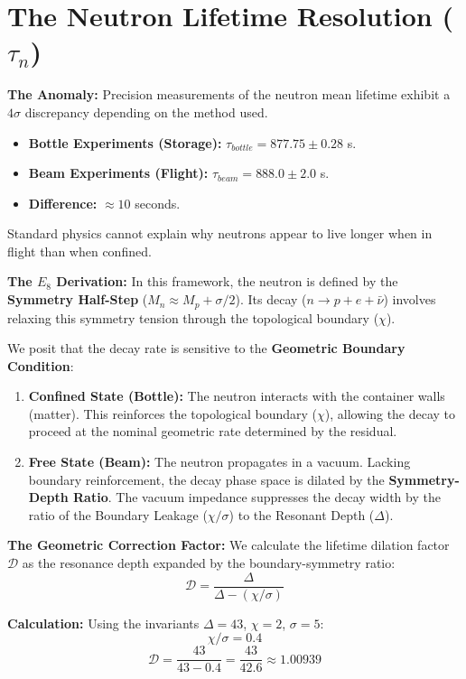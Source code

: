 \section{The Neutron Lifetime Resolution (\texorpdfstring{$\tau_n$}{taun})}

\textbf{The Anomaly:} Precision measurements of the neutron mean lifetime exhibit a $4\sigma$ discrepancy depending on the method used.
\begin{itemize}
    \item \textbf{Bottle Experiments (Storage):} $\tau_{bottle} = 877.75 \pm 0.28$ s.
    \item \textbf{Beam Experiments (Flight):} $\tau_{beam} = 888.0 \pm 2.0$ s.
    \item \textbf{Difference:} $\approx 10$ seconds.
\end{itemize}
Standard physics cannot explain why neutrons appear to live longer when in flight than when confined.

\textbf{The $E_8$ Derivation:} In this framework, the neutron is defined by the \textbf{Symmetry Half-Step} ($M_n \approx M_p + \sigma/2$). Its decay ($n \to p + e + \bar{\nu}$) involves relaxing this symmetry tension through the topological boundary ($\chi$).

We posit that the decay rate is sensitive to the \textbf{Geometric Boundary Condition}:
\begin{enumerate}
    \item \textbf{Confined State (Bottle):} The neutron interacts with the container walls (matter). This reinforces the topological boundary ($\chi$), allowing the decay to proceed at the nominal geometric rate determined by the residual.
    \item \textbf{Free State (Beam):} The neutron propagates in a vacuum. Lacking boundary reinforcement, the decay phase space is dilated by the \textbf{Symmetry-Depth Ratio}. The vacuum impedance suppresses the decay width by the ratio of the Boundary Leakage ($\chi/\sigma$) to the Resonant Depth ($\Delta$).
\end{enumerate}

\textbf{The Geometric Correction Factor:}
We calculate the lifetime dilation factor $\mathcal{D}$ as the resonance depth expanded by the boundary-symmetry ratio:
\begin{equation}
\mathcal{D} = \frac{\Delta}{\Delta - (\chi/\sigma)}
\end{equation}

\textbf{Calculation:}
Using the invariants $\Delta=43$, $\chi=2$, $\sigma=5$:
$$ \chi/\sigma = 0.4 $$
\begin{equation}
\mathcal{D} = \frac{43}{43 - 0.4} = \frac{43}{42.6} \approx \mathbf{1.00939}
\end{equation}

